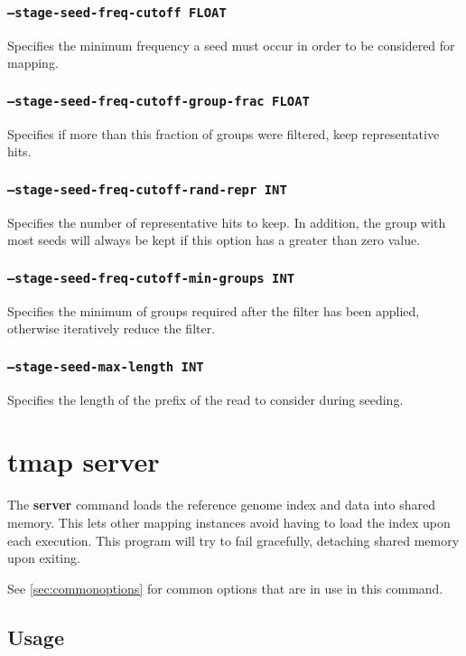 \documentclass[a4paper,12pt]{book}
\newcommand{\TT}[1]{{\tt #1}} %
\newcommand{\BF}[1]{{\bf #1}} %
\begin{document}
\subsubsection{\TT{--stage-seed-freq-cutoff FLOAT}}
Specifies the minimum frequency a seed must occur in order to be considered for mapping.

\subsubsection{\TT{--stage-seed-freq-cutoff-group-frac FLOAT}}
Specifies if more than this fraction of groups were filtered, keep representative hits.
                  
\subsubsection{\TT{--stage-seed-freq-cutoff-rand-repr INT}}
Specifies the number of representative hits to keep.
In addition, the group with most seeds will always be kept if this option has a greater than zero value.

\subsubsection{\TT{--stage-seed-freq-cutoff-min-groups INT}}
Specifies the minimum of groups required after the filter has been applied, otherwise iteratively reduce the filter.

\subsubsection{\TT{--stage-seed-max-length INT}}
Specifies the length of the prefix of the read to consider during seeding.

\section{tmap server}
\label{sec:server}
The \BF{server} command loads the reference genome index and data into shared memory.
This lets other mapping instances avoid having to load the index upon each execution.
This program will try to fail gracefully, detaching shared memory upon exiting.

See \autoref{sec:commonoptions} for common options that are in use in this command.
\subsection{Usage}
\end{document}
